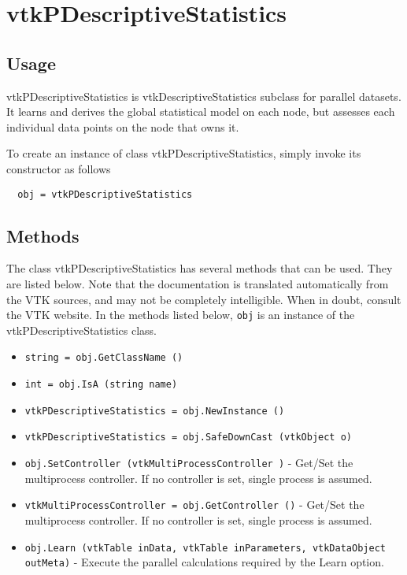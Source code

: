 \section{vtkPDescriptiveStatistics}

\subsection{Usage}

 vtkPDescriptiveStatistics is vtkDescriptiveStatistics subclass for parallel datasets.
 It learns and derives the global statistical model on each node, but assesses each 
 individual data points on the node that owns it.

To create an instance of class vtkPDescriptiveStatistics, simply
invoke its constructor as follows
\begin{verbatim}
  obj = vtkPDescriptiveStatistics
\end{verbatim}
\subsection{Methods}

The class vtkPDescriptiveStatistics has several methods that can be used.
  They are listed below.
Note that the documentation is translated automatically from the VTK sources,
and may not be completely intelligible.  When in doubt, consult the VTK website.
In the methods listed below, \verb|obj| is an instance of the vtkPDescriptiveStatistics class.
\begin{itemize}
\item  \verb|string = obj.GetClassName ()|

\item  \verb|int = obj.IsA (string name)|

\item  \verb|vtkPDescriptiveStatistics = obj.NewInstance ()|

\item  \verb|vtkPDescriptiveStatistics = obj.SafeDownCast (vtkObject o)|

\item  \verb|obj.SetController (vtkMultiProcessController )| -  Get/Set the multiprocess controller. If no controller is set,
 single process is assumed.

\item  \verb|vtkMultiProcessController = obj.GetController ()| -  Get/Set the multiprocess controller. If no controller is set,
 single process is assumed.

\item  \verb|obj.Learn (vtkTable inData, vtkTable inParameters, vtkDataObject outMeta)| -  Execute the parallel calculations required by the Learn option.

\end{itemize}
